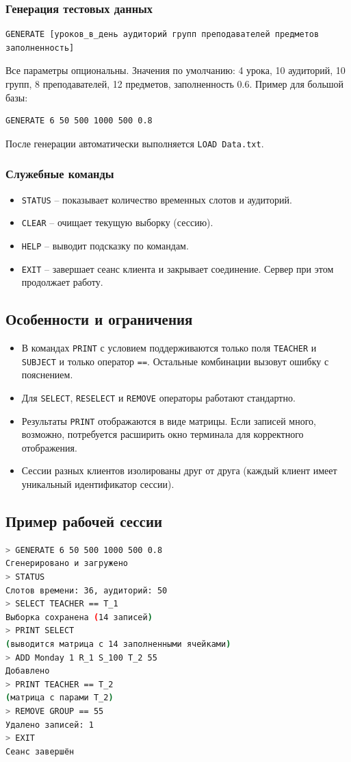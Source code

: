 \documentclass[12pt,a4paper]{article}
\begin{document}
\subsubsection{Генерация тестовых данных}
\begin{lstlisting}
GENERATE [уроков_в_день аудиторий групп преподавателей предметов заполненность]
\end{lstlisting}
Все параметры опциональны. Значения по умолчанию: 4 урока, 10 аудиторий, 10 групп, 8 преподавателей, 12 предметов, заполненность 0.6.  
Пример для большой базы:
\begin{lstlisting}
GENERATE 6 50 500 1000 500 0.8
\end{lstlisting}
После генерации автоматически выполняется \texttt{LOAD Data.txt}.

\subsubsection{Служебные команды}
\begin{itemize}
  \item \texttt{STATUS} – показывает количество временных слотов и аудиторий.
  \item \texttt{CLEAR} – очищает текущую выборку (сессию).
  \item \texttt{HELP} – выводит подсказку по командам.
  \item \texttt{EXIT} – завершает сеанс клиента и закрывает соединение. Сервер при этом продолжает работу.
\end{itemize}

\subsection{Особенности и ограничения}
\begin{itemize}
  \item В командах \texttt{PRINT} с условием поддерживаются только поля \texttt{TEACHER} и \texttt{SUBJECT} и только оператор \texttt{==}. Остальные комбинации вызовут ошибку с пояснением.
  \item Для \texttt{SELECT}, \texttt{RESELECT} и \texttt{REMOVE} операторы работают стандартно.
  \item Результаты \texttt{PRINT} отображаются в виде матрицы. Если записей много, возможно, потребуется расширить окно терминала для корректного отображения.
  \item Сессии разных клиентов изолированы друг от друга (каждый клиент имеет уникальный идентификатор сессии).
\end{itemize}

\subsection{Пример рабочей сессии}
\begin{lstlisting}[language=bash]
> GENERATE 6 50 500 1000 500 0.8
Сгенерировано и загружено
> STATUS
Слотов времени: 36, аудиторий: 50
> SELECT TEACHER == T_1
Выборка сохранена (14 записей)
> PRINT SELECT
(выводится матрица с 14 заполненными ячейками)
> ADD Monday 1 R_1 S_100 T_2 55
Добавлено
> PRINT TEACHER == T_2
(матрица с парами T_2)
> REMOVE GROUP == 55
Удалено записей: 1
> EXIT
Сеанс завершён
\end{lstlisting}
\end{document}
